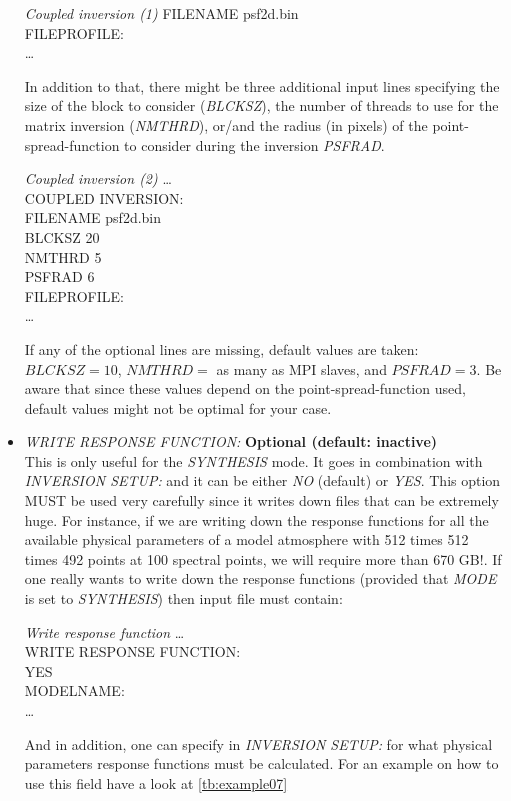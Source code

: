 \begin{itemize}
\begin{ifbox}[label={tb:coupled_inversion1}]{{\it Coupled inversion (1)}}
  FILENAME  psf2d.bin\\
  FILEPROFILE:\\
  \ldots
  \normalsize
\end{ifbox}
  In addition to that, there might be three additional input lines specifying the size of the block to consider ({\it BLCKSZ}), the number of threads to use for the matrix inversion ({\it NMTHRD}), or/and the radius (in pixels) of the point-spread-function to consider during the inversion {\it PSFRAD}.\\
\begin{ifbox}[label={tb:coupled_inversion1}]{{\it Coupled inversion (2)}}
  \scriptsize
  \ldots\\
  COUPLED INVERSION:\\
  FILENAME  psf2d.bin\\
  BLCKSZ 20\\
  NMTHRD 5\\
  PSFRAD 6\\
  FILEPROFILE:\\
  \ldots
  \normalsize
\end{ifbox}
  If any of the optional lines are missing, default values are taken: $BLCKSZ=10$, $NMTHRD=$ as many as MPI slaves, and $PSFRAD=3$. Be aware that since these values depend on the point-spread-function used, default values might not be optimal for your case.
  \item {\it WRITE RESPONSE FUNCTION:} {\bf Optional (default: inactive)}\\
  This is only useful for the {\it SYNTHESIS} mode. It goes in combination with {\it INVERSION SETUP:} and it can be either {\it NO} (default) or {\it YES}. This option MUST be used very carefully since it writes down files that can be extremely huge. For instance, if we are writing down the response functions for all the available physical parameters of a model atmosphere with 512 times 512 times 492 points at 100 spectral points, we will require more than 670 GB!. If one really wants to write down the response functions (provided that {\it MODE} is set to {\it SYNTHESIS}) then input file must contain:
\begin{ifbox}[label={tb:write_response_function}]{{\it Write response function}}
  \scriptsize
  \ldots\\
  WRITE RESPONSE FUNCTION:\\
  YES\\
  MODELNAME:\\
  \ldots
  \normalsize
\end{ifbox}
And in addition, one can specify in {\it INVERSION SETUP:} for what physical parameters response functions must be calculated. For an example on how to use this field have a look at \ref{tb:example07}

\end{itemize}
